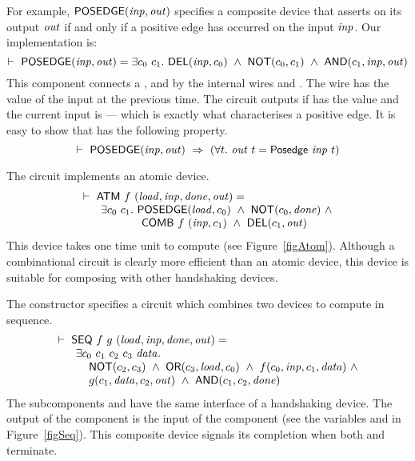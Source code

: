 \documentclass{llncs}
\begin{document}
For example, $\mathsf{POSEDGE}(\mathit{inp},\mathit{out})$ specifies a composite
device that asserts  on its output $\mathit{out}$ if and only if a positive edge
has occurred on the input $\mathit{inp}$. Our implementation is:
\[
\TURNST\ \DEF{POSEDGE} (\VAR{inp},\VAR{out}) = 
    \exists c_0~ c_1.\ \DEF{DEL} (\VAR{inp},c_0)\ \AND\
                  \DEF{NOT} (c_0, c_1)\ \AND\ \DEF{AND} (c_1,\VAR{inp},\VAR{out})
\]
This component connects a ,  and 
by the internal wires  and .
The wire  has the value of the
input at the previous time. The circuit outputs  if
\sVAR{c}{0} has the value  and the current input is  ---
which is exactly what characterises a positive edge.
It is easy to show that  has the 
following property.
\[
\TURNST\ \DEF{POSEDGE} (\VAR{inp},\VAR{out})\ \IMP\
         (\forall t.\ \VAR{out}\ t = \DEF{Posedge}\ \VAR{inp}\ t)
\]

The circuit  implements an atomic device.
\[
\begin{array}{l}
\TURNST\ \DEF{ATM}\ f\ (\VAR{load,inp,done,out}) =\\
\phantom{\TURNST\ ~~}    \exists c_0~ c_1.\ \DEF{POSEDGE} (\VAR{load}, c_0)\ \AND \ 
\DEF{NOT} (c_0, \VAR{done})\ \AND\\
\phantom{\TURNST\ ~~\exists c_0, c_1.\ }  \DEF{COMB}\ f\ (\VAR{inp},c_1)\ \AND\ \DEF{DEL} (c_1,\VAR{out})
\end{array}
\]
This device takes one time unit to compute (see Figure~\ref{figAtom}).
Although a combinational circuit is 
clearly more efficient than an atomic device,
this device is suitable for composing with other
handshaking devices.

The constructor \DEF{SEQ} specifies a circuit which combines
two devices to compute in sequence.
\[
\begin{array}{l}
\TURNST\ \DEF{SEQ}\ f\ g\ (\VAR{load,inp,done,out}) = \\
\phantom{\TURNST\ ~~} \exists c_0~ c_1~ c_2~ c_3~ \VAR{data}.\\
\phantom{\TURNST\ ~~\exists~}                      \DEF{NOT} (c_2,c_3) \ \AND \ 
                      \DEF{OR} (c_3,\VAR{load},c_0) \ \AND \  f (c_0,\VAR{inp},c_1,\VAR{data}) \ \AND \\
\phantom{\TURNST\ ~~ \exists~} 
        g (c_1,\VAR{data},c_2,\VAR{out})\ \AND\ 
        \DEF{AND} (c_1,c_2,\VAR{done}) 
\end{array}
\]
The subcomponents \VAR{f} and  have the same interface of
a handshaking device. The output of the component  
is the input of the component \VAR{g} (see the
variables  and  in Figure~\ref{figSeq}).
This composite device signals its completion when both  and 
\VAR{g} terminate.
\end{document}
